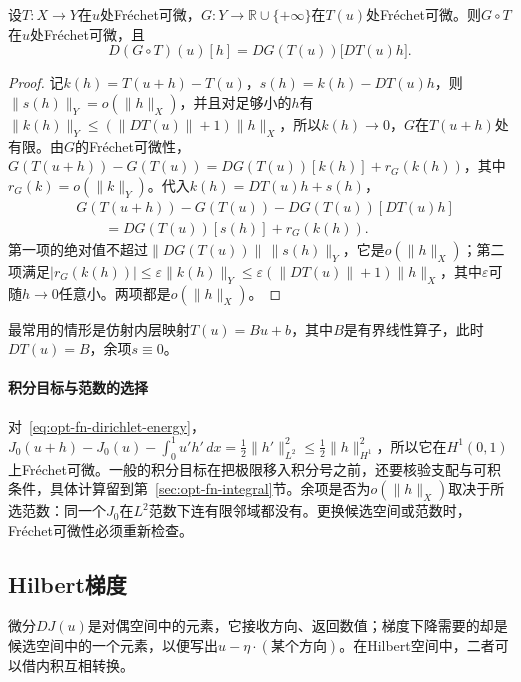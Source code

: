 \begin{theorem}[链式法则]
\label{thm:opt-fn-chain-rule}
设$T:X\to Y$在$u$处Fréchet可微，$G:Y\to\mathbb R\cup\{+\infty\}$在$T(u)$处Fréchet可微。则$G\circ T$在$u$处Fréchet可微，且
\[
 D(G\circ T)(u)[h]=DG(T(u))\bigl[DT(u)h\bigr] .
\]
\end{theorem}

\begin{proof}
记$k(h)=T(u+h)-T(u)$，$s(h)=k(h)-DT(u)h$，则$\|s(h)\|_Y=o(\|h\|_X)$，并且对足够小的$h$有$\|k(h)\|_Y\le(\|DT(u)\|+1)\|h\|_X$，所以$k(h)\to0$，$G$在$T(u+h)$处有限。由$G$的Fréchet可微性，$G(T(u+h))-G(T(u))=DG(T(u))[k(h)]+r_G(k(h))$，其中$r_G(k)=o(\|k\|_Y)$。代入$k(h)=DT(u)h+s(h)$，
\[
 \begin{aligned}
 &G(T(u+h))-G(T(u))-DG(T(u))[DT(u)h]\\
 &\qquad=DG(T(u))[s(h)]+r_G(k(h)) .
 \end{aligned}
\]
第一项的绝对值不超过$\|DG(T(u))\|\,\|s(h)\|_Y$，它是$o(\|h\|_X)$；第二项满足$|r_G(k(h))|\le\varepsilon\|k(h)\|_Y\le\varepsilon(\|DT(u)\|+1)\|h\|_X$，其中$\varepsilon$可随$h\to0$任意小。两项都是$o(\|h\|_X)$。
\end{proof}

最常用的情形是仿射内层映射$T(u)=Bu+b$，其中$B$是有界线性算子，此时$DT(u)=B$，余项$s\equiv0$。

\paragraph{积分目标与范数的选择}
对~\eqref{eq:opt-fn-dirichlet-energy}，$J_0(u+h)-J_0(u)-\int_0^1u'h'\,dx=\frac12\|h'\|_{L^2}^2\le\frac12\|h\|_{H^1}^2$，所以它在$H^1(0,1)$上Fréchet可微。一般的积分目标在把极限移入积分号之前，还要核验支配与可积条件，具体计算留到第~\ref{sec:opt-fn-integral}节。余项是否为$o(\|h\|_X)$取决于所选范数：同一个$J_0$在$L^2$范数下连有限邻域都没有。更换候选空间或范数时，Fréchet可微性必须重新检查。

\subsection{Hilbert梯度}
\label{sec:opt-fn-hilbert-gradient}

微分$DJ(u)$是对偶空间中的元素，它接收方向、返回数值；梯度下降需要的却是候选空间中的一个元素，以便写出$u-\eta\cdot(\text{某个方向})$。在Hilbert空间中，二者可以借内积互相转换。

